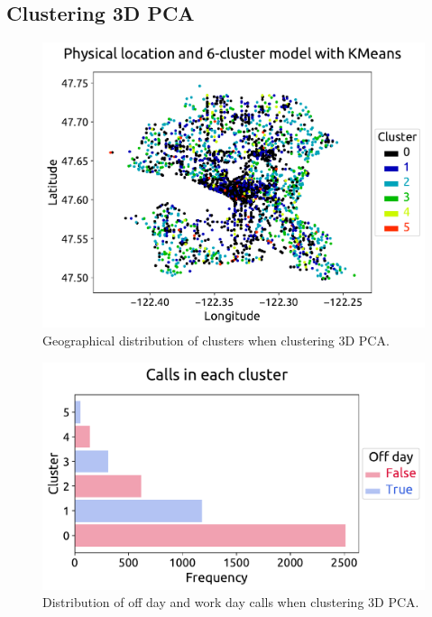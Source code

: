 \documentclass[12pt,a4paper]{article}
\begin{document}
\clearpage

\subsection{Clustering 3D PCA}

\begin{figure}[ht!]
\centering
\includegraphics[scale=0.6]{figs/STORY_3D_PCA_location.pdf}
\caption{Geographical distribution of clusters when clustering 3D PCA.}
\label{STORY_3D_PCA_location}
\end{figure}

\begin{figure}[ht!]
\centering
\includegraphics[scale=0.6]{figs/STORY_3D_PCA_off_days.pdf}
\caption{Distribution of off day and work day calls when clustering 3D PCA.}
\label{STORY_3D_PCA_off_days}
\end{figure}
\end{document}
